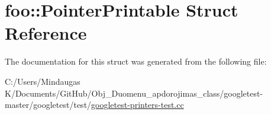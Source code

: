 \hypertarget{structfoo_1_1_pointer_printable}{}\section{foo\+::Pointer\+Printable Struct Reference}
\label{structfoo_1_1_pointer_printable}


The documentation for this struct was generated from the following file\+:\begin{DoxyCompactItemize}
\item 
C\+:/\+Users/\+Mindaugas K/\+Documents/\+Git\+Hub/\+Obj\+\_\+\+Duomenu\+\_\+apdorojimas\+\_\+class/googletest-\/master/googletest/test/\mbox{\hyperlink{googletest-master_2googletest_2test_2googletest-printers-test_8cc}{googletest-\/printers-\/test.\+cc}}\end{DoxyCompactItemize}
